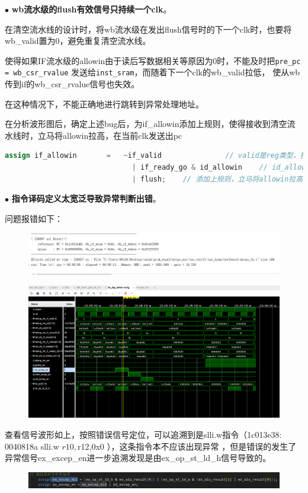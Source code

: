 \documentclass[11pt]{article}
\begin{document}
\noindent
$\bullet$
\textbf{wb流水级的flush有效信号只持续一个clk}。

在清空流水线的设计时，将wb流水级在发出flush信号时的下一个clk时，也要将wb\_valid置为0，避免重复清空流水线。

使得如果IF流水级的allowin由于读后写数据相关等原因为0时，不能及时把\verb|pre_pc = wb_csr_rvalue| 发送给\verb|inst_sram|，而随着下一个clk的wb\_valid拉低，
使从wb传到if的wb\_csr\_rvalue信号也失效。

在这种情况下，不能正确地进行跳转到异常处理地址。

在分析波形图后，确定上述bug后，为if\_allowin添加上规则，使得接收到清空流水线时，立马将allowin拉高，在当前clk发送出pc

\begin{lstlisting}[language=verilog]
  assign if_allowin       =   ~if_valid               // valid是reg类型，接受flush后最快下一个clk才能拉低
                              | if_ready_go & id_allowin    // id_allowin可能由于读后写阻塞，拉低
                              | flush;    // 添加上规则，立马将allowin拉高，在当前clk发送出pc
\end{lstlisting}

\noindent
$\bullet$
\textbf{指令译码定义太宽泛导致异常判断出错}。

问题报错如下：
\begin{figure}[h]
    \centering
    \includegraphics[width=17cm]{fig/1.png}
  \end{figure}
\begin{figure}[H]
    \centering
    \includegraphics[width=15cm]{fig/2.png}
  \end{figure}
查看信号波形如上，按照错误信号定位，可以追溯到是slli.w指令（1c013e38:	0040818a 	slli.w	$r10,$r12,0x0
），这条指令本不应该出现异常
，但是错误的发生了异常信号ex_excep_en进一步追溯发现是由ex_op_st_ld_h信号导致的。
\begin{figure}[H]
    \centering
    \includegraphics[width=15cm]{fig/5.png}
  \end{figure}
\end{document}
